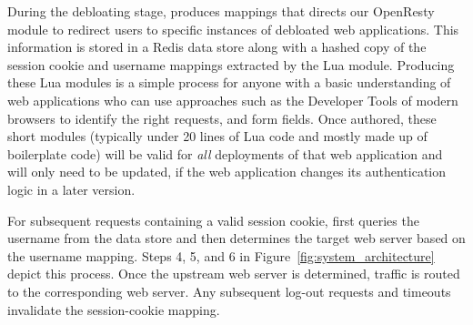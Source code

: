 During the debloating stage, \dbltr{} produces mappings that directs our OpenResty module to redirect users to specific instances of debloated web applications. 
This information is stored in a Redis data store along with a hashed copy of the session cookie and username mappings extracted by the Lua module. Producing these Lua modules is a simple process for anyone with a basic understanding of web applications who can use approaches such as the Developer Tools of modern browsers to identify the right requests, and form fields. Once authored, these short modules (typically under 20 lines of Lua code and mostly made up of boilerplate code) will be valid for \emph{all} deployments of that web application and will only need to be updated, if the web application changes its authentication logic in a later version. 



For subsequent requests containing a valid session cookie, \dbltr{} first queries the username from the data store and then determines the target web server based on the username mapping. 
Steps 4, 5, and 6 in Figure~\ref{fig:system_architecture} depict this process. 
Once the upstream web server is determined, traffic is routed to the corresponding web server. 
Any subsequent log-out requests and timeouts invalidate the session-cookie mapping.